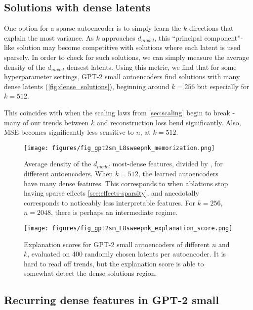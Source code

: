 \subsection{Solutions with dense latents}
\label{sec:dense_solutions}

One option for a sparse autoencoder is to simply learn the $k$ directions that explain the most variance.  As $k$ approaches $d_{model}$, this ``principal component''-like solution may become competitive with solutions where each latent is used sparsely.  In order to check for such solutions, we can simply measure the average density of the $d_{model}$ densest latents.  Using this metric, we find that for some hyperparameter settings, GPT-2 small autoencoders find solutions with many dense latents (\autoref{fig:dense_solutions}), beginning around $k=256$ but especially for $k=512$.  

This coincides with when the scaling laws from \autoref{sec:scaling} begin to break - many of our trends between $k$ and reconstruction loss bend significantly.  Also, MSE becomes significantly less sensitive to $n$, at $k=512$.





\begin{figure}[ht]
    \centering
    \texttt{[image: figures/fig\_gpt2sm\_L8sweepnk\_memorization.png]}
    \caption{Average density of the $d_{model}$ most-dense features, divided by \Lzero, for different autoencoders.  When $k=512$, the learned autoencoders have many dense features.  This corresponds to when ablations stop having sparse effects \autoref{sec:effects-sparsity}, and anecdotally corresponds to noticeably less interpretable features.  For $k=256$, $n=2048$, there is perhaps an intermediate regime.}
    \label{fig:dense_solutions}
\end{figure}


\begin{figure}
    \centering
    \texttt{[image: figures/fig\_gpt2sm\_L8sweepnk\_explanation\_score.png]}
    \caption{Explanation scores for GPT-2 small autoencoders of different $n$ and $k$, evaluated on 400 randomly chosen latents per autoencoder.  It is hard to read off trends, but the explanation score is able to somewhat detect the dense solutions region.}
    \label{fig:grid_explanation_scores}
\end{figure}


\ifpreprint

\subsection{Recurring dense features in GPT-2 small}

